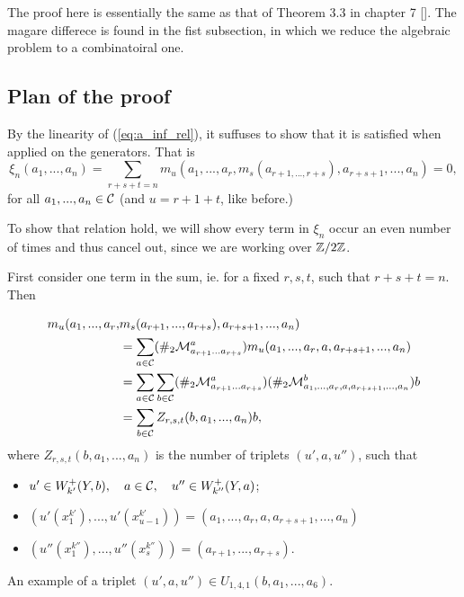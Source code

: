 
The proof here is essentially the same as that of Theorem 3.3 in chapter 7
[\cite{chekanov02}]. The magare differece is found in the fist subsection, in
which we reduce the algebraic problem to a combinatoiral one.

\subsection{Plan of the proof}

By the linearity of (\ref{eq:a_inf_rel}), it suffuses to show that it is
satisfied when applied on the generators. That is 
\[
\xi_n(a_1,...,a_n) = \sum_{r+s+t = n} m_u(a_1,...,a_r, m_s(a_{r+1, ..., r+s}), a_{r+s+1}, ..., a_n)  = 0,  
\]
for all $a_1, ..., a_n \in \mathcal{C}$ (and $u = r+1+t$, like before.)

To show that relation hold, we will show every term in $\xi_n$ occur an even
number of times and thus cancel out, since we are working over $\mathbb{Z}/2\mathbb{Z}$. 

First consider one term in the sum, ie. for a fixed $r,s,t$, such that
$r+s+t=n$. 
Then

\begin{align*}
m_u(a_1,..., a_r, &m_s( a_{r+1}, ..., a_{r+s} ), a_{r+s+1}, ..., a_n) \\
&= \sum_{a\in\mathcal{C}} (\#_2 \mathcal{M}^a_{a_{r+1}...a_{r+s}}) m_u(a_1,...,a_r, a, a_{r+s+1}, ..., a_n ) \\
&= \sum_{a\in\mathcal{C}}\sum_{b\in\mathcal{C}} (\#_2 \mathcal{M}^a_{a_{r+1}...a_{r+s}}) (\#_2 \mathcal{M}^b_{a_1,...,a_r, a, a_{r+s+1}, ..., a_n}) b \\
&= \sum_{b\in\mathcal{C}} Z_{r,s,t}(b,a_1, ..., a_n) b,
\end{align*}
%
where $Z_{r,s,t}(b,a_1,...,a_n)$ is the number of triplets $(u',a,u'')$, such that 
%
\newcommand{\kp}{{k'}}
\newcommand{\kpp}{{k''}}

\begin{itemize}
\item 
$u' \in W^+_\kp(Y,b), \quad a\in \Cc, \quad u'' \in W^+_\kpp(Y,a) $;
\item
$\left( u'(x^\kp_1), ..., u'(x^\kp_{u-1}) \right) = \left(a_1,...,a_r, a, a_{r+s+1}, ..., a_n\right)$
\item
$\left(u''(x^\kpp_1), ..., u''(x^\kpp_s) \right) = \left(a_{r+1},...,a_{r+s}\right)$.
\end{itemize}
{An example of a triplet $(u',a,u'') \in U_{1,4,1}(b,a_1,...,a_6)$.}

